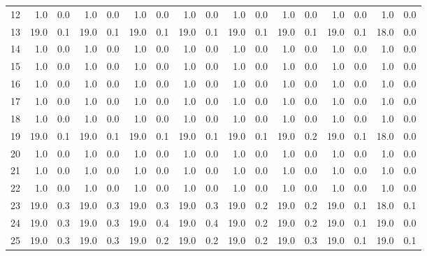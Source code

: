 \begin{tabular}{lrrrrrrrrrrrrrrrr}
     12 &   1.0 &   0.0 &   1.0 &     0.0 &   1.0 &     0.0 &   1.0 &     0.0 &   1.0 &     0.0 &   1.0 &     0.0 &   1.0 &     0.0 &   1.0 &     0.0 \\
     13 &  19.0 &   0.1 &  19.0 &     0.1 &  19.0 &     0.1 &  19.0 &     0.1 &  19.0 &     0.1 &  19.0 &     0.1 &  19.0 &     0.1 &  18.0 &     0.0 \\
     14 &   1.0 &   0.0 &   1.0 &     0.0 &   1.0 &     0.0 &   1.0 &     0.0 &   1.0 &     0.0 &   1.0 &     0.0 &   1.0 &     0.0 &   1.0 &     0.0 \\
     15 &   1.0 &   0.0 &   1.0 &     0.0 &   1.0 &     0.0 &   1.0 &     0.0 &   1.0 &     0.0 &   1.0 &     0.0 &   1.0 &     0.0 &   1.0 &     0.0 \\
     16 &   1.0 &   0.0 &   1.0 &     0.0 &   1.0 &     0.0 &   1.0 &     0.0 &   1.0 &     0.0 &   1.0 &     0.0 &   1.0 &     0.0 &   1.0 &     0.0 \\
     17 &   1.0 &   0.0 &   1.0 &     0.0 &   1.0 &     0.0 &   1.0 &     0.0 &   1.0 &     0.0 &   1.0 &     0.0 &   1.0 &     0.0 &   1.0 &     0.0 \\
     18 &   1.0 &   0.0 &   1.0 &     0.0 &   1.0 &     0.0 &   1.0 &     0.0 &   1.0 &     0.0 &   1.0 &     0.0 &   1.0 &     0.0 &   1.0 &     0.0 \\
     19 &  19.0 &   0.1 &  19.0 &     0.1 &  19.0 &     0.1 &  19.0 &     0.1 &  19.0 &     0.1 &  19.0 &     0.2 &  19.0 &     0.1 &  18.0 &     0.0 \\
     20 &   1.0 &   0.0 &   1.0 &     0.0 &   1.0 &     0.0 &   1.0 &     0.0 &   1.0 &     0.0 &   1.0 &     0.0 &   1.0 &     0.0 &   1.0 &     0.0 \\
     21 &   1.0 &   0.0 &   1.0 &     0.0 &   1.0 &     0.0 &   1.0 &     0.0 &   1.0 &     0.0 &   1.0 &     0.0 &   1.0 &     0.0 &   1.0 &     0.0 \\
     22 &   1.0 &   0.0 &   1.0 &     0.0 &   1.0 &     0.0 &   1.0 &     0.0 &   1.0 &     0.0 &   1.0 &     0.0 &   1.0 &     0.0 &   1.0 &     0.0 \\
     23 &  19.0 &   0.3 &  19.0 &     0.3 &  19.0 &     0.3 &  19.0 &     0.3 &  19.0 &     0.2 &  19.0 &     0.2 &  19.0 &     0.1 &  18.0 &     0.1 \\
     24 &  19.0 &   0.3 &  19.0 &     0.3 &  19.0 &     0.4 &  19.0 &     0.4 &  19.0 &     0.2 &  19.0 &     0.2 &  19.0 &     0.1 &  19.0 &     0.0 \\
     25 &  19.0 &   0.3 &  19.0 &     0.3 &  19.0 &     0.2 &  19.0 &     0.2 &  19.0 &     0.2 &  19.0 &     0.3 &  19.0 &     0.1 &  19.0 &     0.1 \\

\end{tabular}

